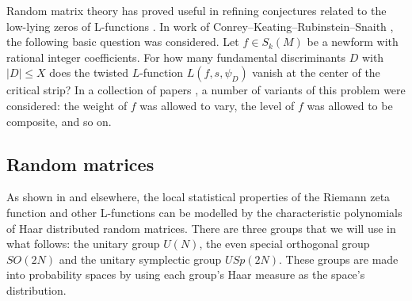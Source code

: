 \documentclass[11pt]{amsart}
\begin{document}
Random matrix theory has proved useful in refining conjectures related to the low-lying zeros of L-functions \cite{KeatingSnaith2,KeatingSnaith1}.  In work of Conrey--Keating--Rubinstein--Snaith \cite{CKRS}, the following basic question was considered.  Let $f \in S_k(M)$ be a newform with rational integer coefficients.  For how many fundamental discriminants $D$ with $|D|\leq X$ does the twisted $L$-function  $L (f,s,\psi_D)$ vanish at the center of the critical strip?  In a collection of papers \cite{MRVT,PT,TR}, a number of variants of this problem were considered: the weight of $f$ was allowed to vary, the level of $f$ was allowed to be composite, and so on.


\subsection{Random matrices}

As shown in \cite{KeatingSnaith2,KeatingSnaith1,rubinstein,montgomery} and elsewhere, the local statistical properties of the Riemann zeta function and other L-functions can be modelled by the characteristic polynomials of Haar distributed random matrices.  There are three groups that we will use in what follows:  the unitary group $U(N)$, the even special orthogonal group $SO(2N)$ and the unitary symplectic group $USp(2N)$.  These groups are made into probability spaces by using each group's Haar measure as the space's distribution.  
\end{document}
